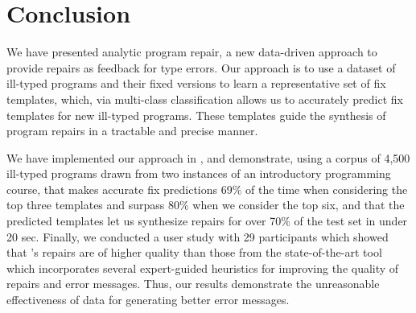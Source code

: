 \section{Conclusion}
\label{sec:conclusion}

We have presented analytic program repair, a new data-driven 
approach to provide repairs as feedback for type errors.
%
Our approach is to use a dataset of ill-typed
programs and their fixed versions to learn a representative set of fix
templates, which, via multi-class classification allows us to 
accurately predict fix templates for new ill-typed programs. 
These templates guide the synthesis of program repairs in 
a tractable and precise manner.

We have implemented our approach in \toolname, and demonstrate,
using a corpus of 4,500 ill-typed \ocaml programs drawn from 
two instances of an introductory programming course, 
that \toolname makes accurate fix predictions 69\% 
of the time when considering the top three templates 
and surpass 80\% when we consider the top six,
and that the predicted templates let us synthesize 
repairs for over 70\% of the test set in under 20 sec.
%
Finally, we conducted a user study with 29 participants 
which showed that \toolname's repairs are of higher 
quality than those from the state-of-the-art \seminal 
tool which incorporates several expert-guided heuristics 
for improving the quality of repairs and error messages.
%
Thus, our results demonstrate the unreasonable effectiveness
of data for generating better error messages.
